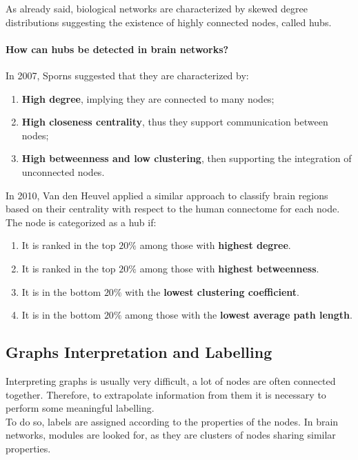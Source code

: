 As already said, biological networks are characterized by skewed degree distributions suggesting the existence of highly
connected nodes, called hubs.
\paragraph{How can hubs be detected in brain networks?} In 2007, Sporns suggested that they are characterized by:
\begin{enumerate}
    \item \textbf{High degree}, implying they are connected to many nodes;
    \item \textbf{High closeness centrality}, thus they support communication between nodes;
    \item \textbf{High betweenness and low clustering}, then supporting the integration of unconnected nodes.
\end{enumerate}
In 2010, Van den Heuvel applied a similar approach to classify brain regions based on their centrality with respect to
the human connectome for each node. The node is categorized as a hub if:
\begin{enumerate}
    \item It is ranked in the top \(20\%\) among those with \textbf{highest degree}.
    \item It is ranked in the top \(20\%\) among those with \textbf{highest betweenness}.
    \item It is in the bottom \(20\%\) with the \textbf{lowest clustering coefficient}.
    \item It is in the bottom \(20\%\) among those with the \textbf{lowest average path length}.
\end{enumerate}

\subsection{Graphs Interpretation and Labelling}
Interpreting graphs is usually very difficult, a lot of nodes are often connected together. Therefore, to extrapolate
information from them it is necessary to perform some meaningful labelling.\\
To do so, labels are assigned according to the properties of the nodes. In brain networks, modules are looked for, as they
are clusters of nodes sharing similar properties.
